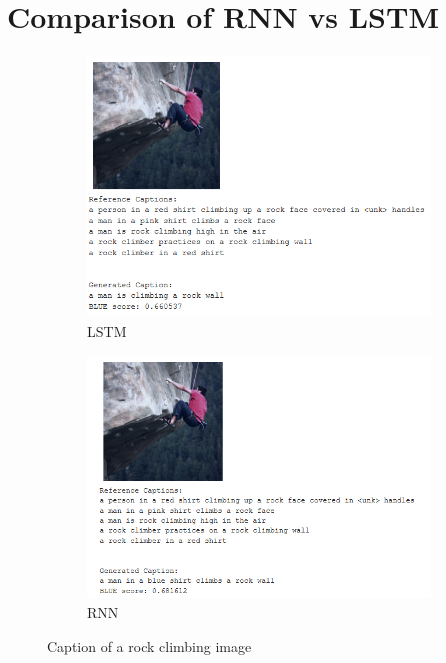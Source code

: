 \documentclass{article}
\begin{document}
    \section{Comparison of RNN vs LSTM}
    \begin{figure}[h!]
        \centering
        \begin{subfigure}[t]{0.4\textwidth}
            \centering
            \includegraphics[width=1\textwidth]{climb_lstm.PNG}
            \caption{LSTM}
            \label{figc:figa}
        \end{subfigure}
        \begin{subfigure}[t]{0.4\textwidth}
            \centering
            \includegraphics[width=1\textwidth]{climb_rnn.PNG}
            \caption{RNN}
            \label{figc:figb}
        \end{subfigure}
        \caption{Caption of a rock climbing image}
        \label{figc}
    \end{figure}
\end{document}
